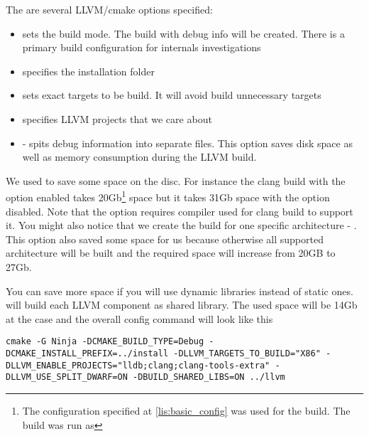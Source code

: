 The are several LLVM/cmake options specified:
\begin{itemize}
\item {} sets the build
  mode. The build with debug info will be created. There is a primary build
  configuration for \clang internals investigations
\item {} specifies the
  installation folder
\item {} sets exact
  targets to be build. It will avoid build unnecessary targets
\item {}
  specifies LLVM projects that we care about
\item {} - spits debug information into
  separate files. This option saves disk space as well as memory
  consumption during the LLVM build.
\end{itemize}

We used  to save some space on the disc. For
instance the clang build with the option enabled takes 20Gb\footnote{The
configuration specified at \cref{lis:basic_config} was used for the build. The
build was run as } space but it takes 31Gb space with the
option disabled. Note that the option requires compiler used for clang build to
support it. You might also notice that we create the build for one specific
architecture - . This option also saved some space for us because
otherwise all supported architecture will be built and the required space will
increase from 20GB to 27Gb.

You can save more space if you will use dynamic libraries instead of static
ones.   will build each LLVM component as shared
library. The used space will be 14Gb at the case and the overall config command
will look like this
\begin{verbatim}
cmake -G Ninja -DCMAKE_BUILD_TYPE=Debug -DCMAKE_INSTALL_PREFIX=../install -DLLVM_TARGETS_TO_BUILD="X86" -DLLVM_ENABLE_PROJECTS="lldb;clang;clang-tools-extra" -DLLVM_USE_SPLIT_DWARF=ON -DBUILD_SHARED_LIBS=ON ../llvm
\end{verbatim}


